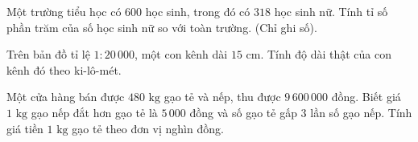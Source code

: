 \begin{ex} %
Một trường tiểu học có $600$ học sinh, trong đó có $318$ học sinh nữ. Tính tỉ số phần trăm của số học sinh nữ so với toàn trường. (Chỉ ghi số).
\end{ex}

\begin{ex} %
Trên bản đồ tỉ lệ $1 : 20\,000$, một con kênh dài $15\text{ cm}$. Tính độ dài thật của con kênh đó theo ki-lô-mét.
\end{ex}

\begin{ex} %
Một cửa hàng bán được $480\text{ kg}$ gạo tẻ và nếp, thu được $9\,600\,000$ đồng. Biết giá $1\text{ kg}$ gạo nếp đắt hơn gạo tẻ là $5\,000$ đồng và số gạo tẻ gấp $3$ lần số gạo nếp. Tính giá tiền $1\text{ kg}$ gạo tẻ theo đơn vị nghìn đồng.
\end{ex}
